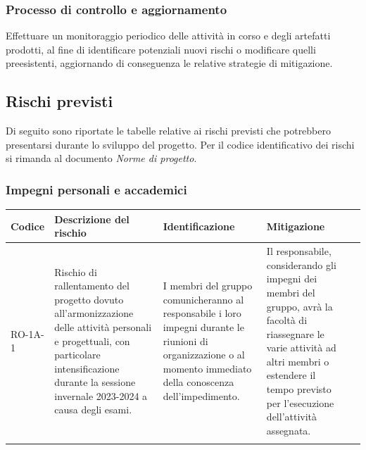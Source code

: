 \documentclass{article}
\begin{document}
\subsubsection{Processo di controllo e aggiornamento}
Effettuare un monitoraggio periodico delle attività in corso e degli artefatti prodotti, al fine di identificare potenziali nuovi rischi o modificare quelli preesistenti, aggiornando di conseguenza le relative strategie di mitigazione.

\subsection{Rischi previsti}
Di seguito sono riportate le tabelle relative ai rischi previsti che potrebbero presentarsi durante lo sviluppo del progetto. Per il codice identificativo dei rischi si rimanda al documento \textit{Norme di progetto}.


\subsubsection{Impegni personali e accademici}
\begin{table}[h]
    \centering
    \begin{tabularx}{\textwidth}{l>{\RaggedRight}X>{\RaggedRight}X>{\RaggedRight}X>{\RaggedRight}X}
    \toprule
    \rowcolor{gray!50}
    \textbf{Codice} & \textbf{Descrizione del rischio} & \textbf{Identificazione} & \textbf{Mitigazione} \\
    \midrule
    \addlinespace 
    RO-1A-1 & 
    Rischio di rallentamento del progetto dovuto all'armonizzazione delle attività personali e progettuali, con particolare intensificazione durante la sessione invernale 2023-2024 a causa degli esami. & 
    I membri del gruppo comunicheranno al responsabile i loro impegni durante le riunioni di organizzazione o al momento immediato della conoscenza dell'impedimento.& 
    Il responsabile, considerando gli impegni dei membri del gruppo, avrà la facoltà di riassegnare le varie attività ad altri membri o estendere il tempo previsto per l'esecuzione dell'attività assegnata. \\  
    \bottomrule
    \addlinespace 
    \end{tabularx}
\end{table}
\newpage
\end{document}
